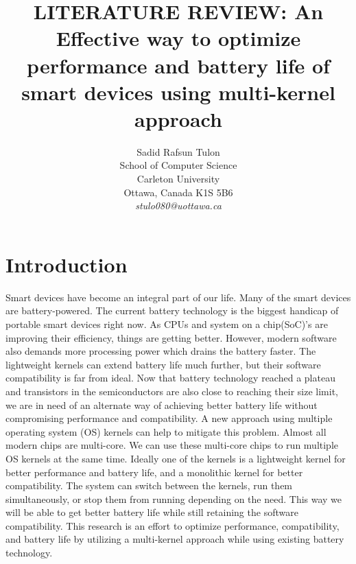 \documentclass[11pt]{article}       %
\begin{document}


\title{LITERATURE REVIEW: An Effective way to optimize performance and battery life of smart devices using multi-kernel approach}


\author{
Sadid Rafsun Tulon\\
School of Computer Science\\
Carleton University\\
Ottawa, Canada K1S 5B6\\
{\em stulo080@uottawa.ca}
} %

\maketitle



\section{Introduction} \label{intro}

Smart devices have become an integral part of our life. Many of the smart devices are battery-powered. The current battery technology is the biggest handicap of portable smart devices right now. As CPUs and system on a chip(SoC)’s are improving their efficiency, things are getting better. However, modern software also demands more processing power which drains the battery faster. The lightweight kernels can extend battery life much further, but their software compatibility is far from ideal. Now that battery technology reached a plateau and transistors in the semiconductors are also close to reaching their size limit, we are in need of an alternate way of achieving better battery life without compromising performance and compatibility. A new approach using multiple operating system (OS) kernels can help to mitigate this problem. Almost all modern chips are multi-core. We can use these multi-core chips to run multiple OS kernels at the same time. Ideally one of the kernels is a lightweight kernel for better performance and battery life, and a monolithic kernel for better compatibility. The system can switch between the kernels, run them simultaneously, or stop them from running depending on the need. This way we will be able to get better battery life while still retaining the software compatibility. This research is an effort to optimize performance, compatibility, and battery life by utilizing a multi-kernel approach while using existing battery technology. 
\end{document}
